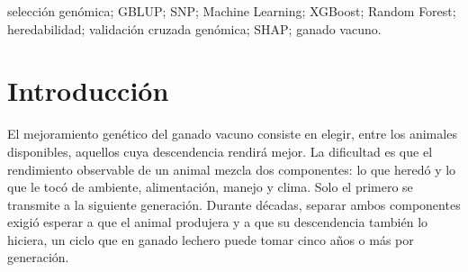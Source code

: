 \documentclass[conference]{IEEEtran}
\begin{document}
\begin{abstract}
La selección genómica permite estimar el mérito genético de un animal a
partir de su perfil de marcadores moleculares, sin esperar a que exprese
el rasgo ni a evaluar su descendencia. El método de referencia en la
industria es GBLUP, que asume efectos aditivos e infinitesimales sobre
todos los marcadores. Este trabajo evalúa si modelos de Machine Learning
capaces de representar efectos no aditivos superan a GBLUP en precisión
de predicción, y bajo qué condiciones lo hacen. Se trabaja con dos
fuentes genómicas de igual formato: el conjunto Holstein alemán de Zhang
\textit{et al.}, con 5\,024 toros genotipados en 42\,551 SNPs y tres
rasgos productivos, y un conjunto simulado con AlphaSimR en tres
escenarios de tamaño poblacional ($n = 125$, $500$ y $2\,000$) con
heredabilidad objetivo $h^2 = 0{,}30$. Los cinco modelos comparados son
GBLUP como línea base, regresión ridge, Random Forest, XGBoost y un
perceptrón multicapa, evaluados con particiones construidas sobre la
matriz de relación genómica para evitar fuga de información entre
parientes. La métrica principal es la correlación de Pearson entre el
valor predicho y el mérito genético observado. Los marcadores más
influyentes según SHAP se anotan a gen mediante la API REST de Ensembl y
se contrastan con la literatura mediante PubMed, de modo que la
interpretación del modelo quede respaldada por evidencia biológica
externa.
\end{abstract}

\begin{IEEEkeywords}
selección genómica; GBLUP; SNP; Machine Learning; XGBoost; Random Forest;
heredabilidad; validación cruzada genómica; SHAP; ganado vacuno.
\end{IEEEkeywords}

\section{Introducción}

El mejoramiento genético del ganado vacuno consiste en elegir, entre los
animales disponibles, aquellos cuya descendencia rendirá mejor. La
dificultad es que el rendimiento observable de un animal mezcla dos
componentes: lo que heredó y lo que le tocó de ambiente, alimentación,
manejo y clima. Solo el primero se transmite a la siguiente generación.
Durante décadas, separar ambos componentes exigió esperar a que el animal
produjera y a que su descendencia también lo hiciera, un ciclo que en
ganado lechero puede tomar cinco años o más por generación.
\end{document}
